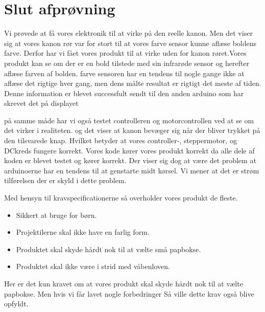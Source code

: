 \section{Slut afprøvning} \label{sluttest}
Vi prøvede at få vores elektronik til at virke på den reelle kanon. Men det viser sig at vores kanon rør var for stort til at vores farve sensor kunne aflæse boldens farve.
Derfor har vi fået vores produkt til at virke uden for kanon røret.Vores produkt kan se om der er en bold tilstede med sin infrarøde sensor og herefter aflæse farven af bolden. farve sensoren har en tendens til nogle gange ikke at aflæse det rigtige hver gang, men dens målte resultat er rigtigt det meste af tiden.
Denne information er blevet successfult sendt til den anden arduino som har skrevet det på displayet


på samme måde har vi også testet controlleren og motorcontrollen ved at se om det virker i realiteten. og det viser at kanon bevæger sig når der bliver trykket på den tilsvarede knap. Hvilket betyder at vores controller-, steppermotor, og DCkreds fungere korrekt.
Vores kode kører vores produkt korrekt da alle dele af koden er blevet testet og kører korrekt. Der viser sig dog at være det problem at arduinoerne har en tendens til at genstarte midt kørsel. Vi mener at det er strøm tilførelsen der er skyld i dette problem.

Med hensyn til kravspecificationerne så overholder vores produkt de fleste.

\begin{itemize}
\item Sikkert at bruge for børn.
\item Projektilerne skal ikke have en farlig form.
\item Produktet skal skyde hårdt nok til at vælte små papbokse.
\item Produktet skal ikke være i strid med våbenloven.
\end{itemize}
 
Her er det kun kravet om at vores produkt skal skyde hårdt nok til at vælte papbokse. Men hvis vi får lavet nogle forbedringer Så ville dette krav også blive opfyldt. 



